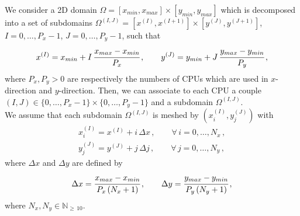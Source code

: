 \documentclass[10pt]{article}
\newcommand{\N}{{\mathbb N}}
\begin{document}
We consider a 2D domain $\Omega = [x_{min},x_{max}] \times [y_{min},y_{max}]$ which is decomposed into a set of subdomains $\Omega^{(I,J)} = [x^{(I)},x^{(I+1)}] \times [y^{(J)},y^{(J+1)}]$, $I = 0,\dots,P_{x}-1$, $J = 0,\dots,P_{y}-1$, such that
\begin{equation}
x^{(I)} = x_{min} + I\,\cfrac{x_{max}-x_{min}}{P_{x}} \, , \qquad y^{(J)} = y_{min} + J\,\cfrac{y_{max}-y_{min}}{P_{y}} \, ,
\end{equation}
where $P_{x}, P_{y} > 0$ are respectively the numbers of CPUs which are used in $x$-direction and $y$-direction. Then, we can associate to each CPU a couple $(I,J) \in \{0,\dots,P_{x}-1\} \times \{0,\dots,P_{y}-1\}$ and a subdomain $\Omega^{(I,J)}$. \\
\indent We assume that each subdomain $\Omega^{(I,J)}$ is meshed by $(x_{i}^{(I)},y_{j}^{(J)})$ with
\begin{equation}
\begin{split}
x_{i}^{(I)} = x^{(I)} + i\,\Delta x \, , \qquad \forall\, i=0,\dots,N_{x} \, , \\
y_{j}^{(J)} = y^{(J)} + j\,\Delta j \, , \qquad \forall\, j=0,\dots,N_{y} \, , 
\end{split}
\end{equation}
where $\Delta x$ and $\Delta y$ are defined by
\begin{equation}
\Delta x = \cfrac{x_{max}-x_{min}}{P_{x}\,(N_{x}+1)} \, , \qquad \Delta y = \cfrac{y_{max}-y_{min}}{P_{y}\,(N_{y}+1)} \, ,
\end{equation}
where $N_{x},N_{y} \in \N_{\geq \,10}$. \\
\end{document}
